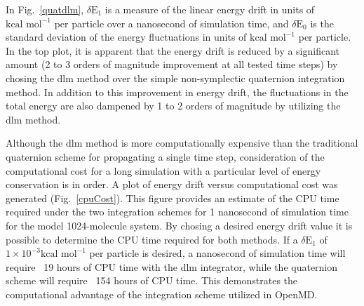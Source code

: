 \documentclass[]{book}
\begin{document}
In Fig.~\ref{quatdlm}, $\delta \mbox{E}_1$ is a measure of the linear
energy drift in units of $\mbox{kcal mol}^{-1}$ per particle over a
nanosecond of simulation time, and $\delta \mbox{E}_0$ is the standard
deviation of the energy fluctuations in units of $\mbox{kcal
mol}^{-1}$ per particle. In the top plot, it is apparent that the
energy drift is reduced by a significant amount (2 to 3 orders of
magnitude improvement at all tested time steps) by chosing the {\sc
dlm} method over the simple non-symplectic quaternion integration
method.  In addition to this improvement in energy drift, the
fluctuations in the total energy are also dampened by 1 to 2 orders of
magnitude by utilizing the {\sc dlm} method.

Although the {\sc dlm} method is more computationally expensive than
the traditional quaternion scheme for propagating a single time step,
consideration of the computational cost for a long simulation with a
particular level of energy conservation is in order.  A plot of energy
drift versus computational cost was generated
(Fig.~\ref{cpuCost}). This figure provides an estimate of the CPU time
required under the two integration schemes for 1 nanosecond of
simulation time for the model 1024-molecule system.  By chosing a
desired energy drift value it is possible to determine the CPU time
required for both methods. If a $\delta \mbox{E}_1$ of $1 \times
10^{-3} \mbox{kcal mol}^{-1}$ per particle is desired, a nanosecond of
simulation time will require ~19 hours of CPU time with the {\sc dlm}
integrator, while the quaternion scheme will require ~154 hours of CPU
time. This demonstrates the computational advantage of the integration
scheme utilized in {\sc OpenMD}.
\end{document}
